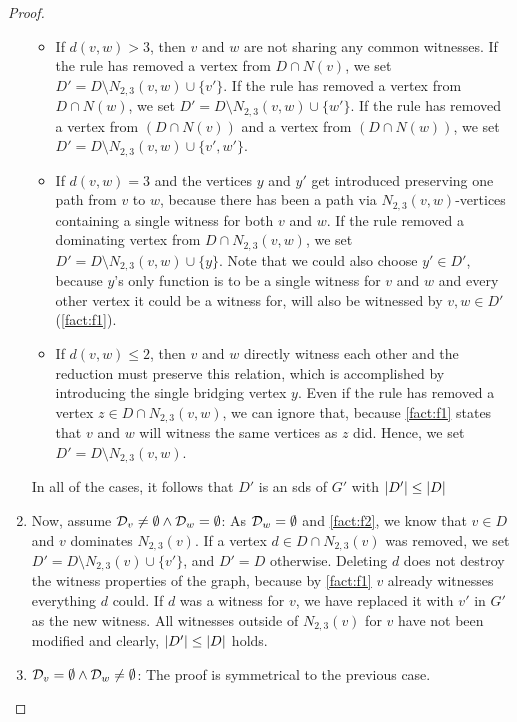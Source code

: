 \begin{proof}
\begin{enumerate}
\begin{itemize}
            \item If $d(v,w) > 3$, then $v$ and $w$ are not sharing any common witnesses. 
            If the rule has removed a vertex from $D \cap N(v)$, we set $D' = D \setminus N_{2,3}(v,w) \cup \{v'\}$.
            If the rule has removed a vertex from $D \cap N(w)$, we  set $D' = D \setminus N_{2,3}(v,w) \cup \{w'\}$.
            If the rule has removed a vertex from $(D \cap N(v))$ and a vertex from $(D \cap N(w))$, we set $D' = D \setminus N_{2,3}(v,w) \cup \{v', w'\}$.
            \item If $d(v,w) = 3$ and the vertices $y$ and $y'$ get introduced preserving one path from $v$ to $w$, because there has been a path via $N_{2,3}(v,w)$-vertices containing a single witness for both $v$ and $w$.
            If the rule removed a dominating vertex from $D \cap N_{2,3}(v, w)$, we set $D' = D \setminus N_{2,3}(v,w) \cup \{y\}$. Note that we could also choose $y' \in D'$, because $y$'s only function is to be a single witness for $v$ and $w$ and every other vertex it could be a witness for, will also be witnessed by $v,w \in D'$ (\cref{fact:f1}).
            \item If $d(v,w) \leq 2$, then $v$ and $w$ directly witness each other and the reduction must preserve this relation, which is accomplished by introducing the single bridging vertex $y$. 
            Even if the rule has removed a vertex $z \in D \cap N_{2,3}(v,w)$, we can ignore that, because \cref{fact:f1} states that $v$ and $w$ will witness the same vertices as $z$ did. Hence, we set $D' = D \setminus N_{2,3}(v,w)$.
        \end{itemize}
        
        In all of the cases, it follows that $D'$ is an sds of $G'$ with $\abs{D'} \leq \abs{D}$ 
        
        \item  Now, assume $ \mathcal{D}_{v} \neq \emptyset  \wedge \mathcal{D}_{w} = \emptyset$: As $\mathcal{D}_{w} = \emptyset$ and \cref{fact:f2}, we know that $v \in D$ and $v$ dominates $N_{2,3}(v)$. 
        If a vertex $d \in D \cap N_{2,3}(v)$ was removed, we set $D' = D \setminus N_{2,3}(v) \cup \{v'\}$, and $D' = D$ otherwise.
        Deleting $d$ does not destroy the witness properties of the graph, because by \cref{fact:f1} $v$ already witnesses everything $d$ could. 
        If $d$ was a witness for $v$, we have replaced it with $v'$ in $G'$ as the new witness.
        All witnesses outside of $N_{2,3}(v)$  for $v$ have not been modified and clearly, $\abs{D'} \leq \abs{D}$ holds.
        \item  $ \mathcal{D}_{v} = \emptyset  \wedge \mathcal{D}_{w} \neq  \emptyset $: The proof is symmetrical to the previous case.
    \end{enumerate}


\end{proof}
